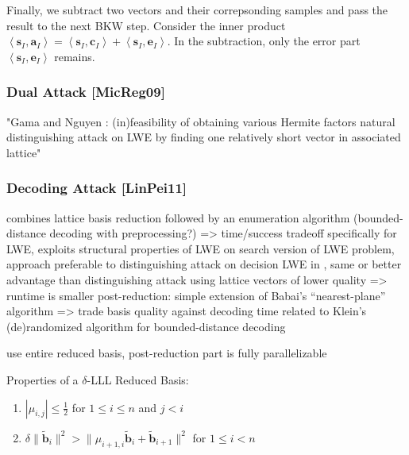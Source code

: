 Finally, we subtract two vectors and their correpsonding samples and pass the result to the next BKW step. Consider the inner product$\left\langle \textbf{s}_{I}, \textbf{a}_{I} \right\rangle = \left\langle \textbf{s}_{I}, \textbf{c}_{I} \right\rangle + \left\langle \textbf{s}_{I}, \textbf{e}_{I} \right\rangle$. In the subtraction, only the error part $\left\langle \textbf{s}_{I}, \textbf{e}_{I} \right\rangle$ remains. 




\subsubsection{Dual Attack [MicReg09]}
"Gama and Nguyen \cite{GN08b}: (in)feasibility of obtaining various Hermite factors
natural distinguishing attack on LWE by finding one relatively short vector in associated lattice"

\subsubsection{Decoding Attack [LinPei11]}

combines lattice basis reduction followed by an enumeration algorithm (bounded-distance decoding with preprocessing?) => time/success tradeoff
specifically for LWE, exploits structural properties of LWE
on search version of LWE problem, approach preferable to distinguishing attack on decision LWE in \cite{MR09, RS10}, same or better advantage than distinguishing attack using lattice vectors of lower quality => runtime is smaller
post-reduction: simple extension of Babai's ``nearest-plane'' algorithm \cite{Bab85} %
=> trade basis quality against decoding time
related to Klein's (de)randomized algorithm \cite{Kle00} for bounded-distance decoding

use entire reduced basis, post-reduction part is fully parallelizable


Properties of a $\delta$-LLL Reduced Basis: %
\begin{enumerate}
  \item $|\mu_{i,j}| \leq \frac{1}{2}$ for $1\leq i \leq n$ and $j < i$
  \item $\delta \| \tilde{\textbf{b}}_i \|^2 > \| \mu_{i+1, i} \tilde{\textbf{b}}_i + \tilde{\textbf{b}}_{i+1} \|^2$ for $1\leq i < n$
\end{enumerate}

